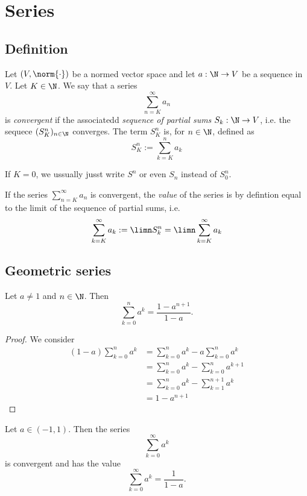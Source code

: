 \section{Series}

\subsection{Definition}
\begin{definition}
    Let $(V, \norm{\cdot})$ be a normed vector space and let $a: \N \to V$ be a sequence in $V$. Let $K \in \N$. We say that a series
    $$\sum_{n=K}^{\infty}a_n$$
    is \emph{convergent} if the associatedd \emph{sequence of partial sums} $S_k:\N \to V$, i.e. the sequece $(S_K^n)_{n\in\N}$ converges. The term $S_K^n$ is, for $n \in \N$, defined as
    $$S_K^n:= \sum_{k=K}^na_k$$

    If $K = 0$, we ussually jusst write $S^n$ or even $S_n$ instead of $S_0^n$.

    If the series $\sum_{n=K}^\infty a_n$ is convergent, the \emph{value} of the series is by defintion equal to the limit of  the sequence of partial sums, i.e.
    $$\sum_{k=K}^\infty a_k := \limn S_k^n = \limn \sum_{k=K}^\infty a_k$$
\end{definition}

\subsection{Geometric series}
\begin{proposition}
    Let $a \ne 1$ and $n \in \N$. Then
    $$\sum_{k=0}^n a^k = \frac{1-a^{n+1}}{1-a}.$$
\end{proposition}
\begin{proof}
    We consider
    \begin{align*}
        (1-a)\sum_{k=0}^n a^k &= \sum_{k=0}^n a^k - a\sum_{k=0}^n a^k  \\
                              &= \sum_{k=0}^n a^k - \sum_{k=0}^n a^{k+1} \\
                              &= \sum_{k=0}^n a^k - \sum_{k=1}^{n+1} a^k \\
                              &= 1 - a^{n+1}
    \end{align*}
\end{proof}

\begin{proposition}
    Let $a \in (-1,1)$. Then the series
    $$\sum_{k=0}^\infty a^k$$
    is convergent and has the value
    $$\sum_{k=0}^\infty a^k = \frac{1}{1-a}.$$
\end{proposition}

